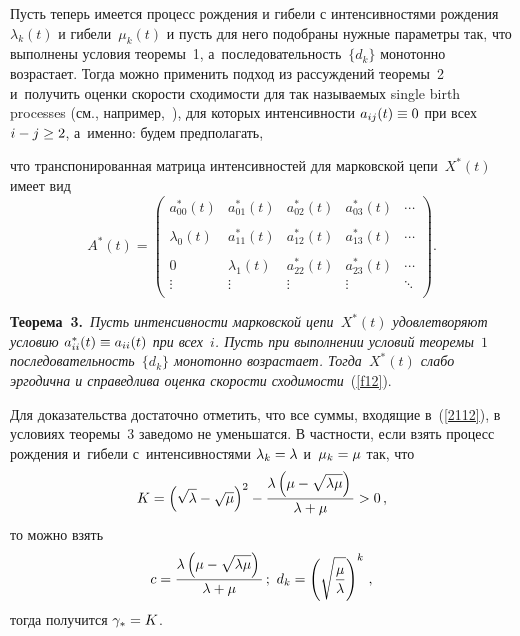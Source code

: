 \begin{multicols}{2}
\smallskip

Пусть теперь имеется процесс рождения и гибели с интенсивностями рождения 
$\lambda_k(t)$ и гибели~$\mu_k(t)$ и пусть для него подобраны нужные параметры 
так, что выполнены условия теоремы~1, а~последователь\-ность~$\{d_k\}$ 
монотонно возрастает. Тогда можно применить подход из рассуждений тео\-ре\-мы~2 и~получить оценки скорости сходимости для так называемых single birth 
processes (см., например,~\cite{mufa,mao}), для которых интенсивности $a_{ij}(t) 
\hm\equiv 0$ при всех $i\hm-j \hm\ge 2$,
а~именно: будем предполагать,\linebreak\vspace*{-12pt}

\columnbreak

\noindent
 что транспонированная матрица интенсивностей для 
марковской цепи~$X^*(t)$ имеет вид
    \begin{equation*}
        A^*(t)=\left(
        \begin{array}{cccccccccccccc}
            a_{00}^*(t) & a_{01}^*(t)  & a_{02}^*(t)  & a_{03}^*(t)  & 
\cdots \\
            \\
            \lambda_0(t) & a_{11}^*(t) & a_{12}^*(t)   & a_{13}^*(t)  & 
\cdots \\
            \\
            0 & \lambda_1(t) & a_{22}^*(t) & a_{23}^*(t)    & \cdots \\
            \vdots   & \vdots & \vdots  & \vdots    & \ddots \\
        \end{array}
        \right).
    \end{equation*}


\noindent
\textbf{Теорема~3.}\
\textit{Пусть интенсивности марковской цепи~$X^*(t)$ удовлетворяют условию 
$a_{ii}^*(t)\hm \equiv a_{ii}(t)$ при всех~$i$. Пусть при выполнении условий 
теоремы~$1$ последовательность~$\{d_k\}$ монотонно возрастает. Тогда~$X^*(t)$ 
слабо эргодична и справедлива оценка скорости сходимости}~(\ref{f12}).

\smallskip

Для доказательства достаточно отметить, что все суммы, входящие в~(\ref{2112}), 
в условиях теоремы~3 заведомо не уменьшатся.
В частности, если взять процесс рождения и~гибели с~интенсивностями 
$\lambda_k\hm=\lambda$ и~$\mu_k\hm=\mu$ так, что 
$$
K=\left(\sqrt{\lambda}- \sqrt{\mu}\right)^2-\displaystyle\frac{\displaystyle \lambda\left(\mu-\sqrt{\lambda 
\mu}\right)\mathstrut}{\displaystyle \lambda+\mu\mathstrut} >0\,,
$$
 то можно взять 
\begin{gather*}
 c=\displaystyle\frac{\displaystyle \lambda\left(\mu-\sqrt{\lambda \mu}\right)\mathstrut}{\displaystyle \lambda+\mu\mathstrut}\,;\
d_k=\left(\sqrt{\displaystyle\frac{\displaystyle \mu\mathstrut}{\displaystyle \lambda\mathstrut}}\right)^k\,,
\end{gather*}
 тогда получится $\gamma_*\hm=K$.




\end{multicols}

